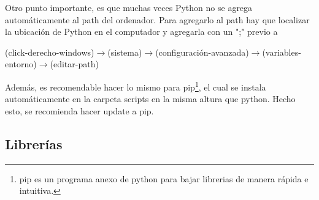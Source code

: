 \documentclass{article}
\begin{document}
Otro punto importante, es que muchas veces Python no se agrega automáticamente al path del ordenador. Para agregarlo al path hay que localizar la ubicación de Python en el computador y agregarla con un ";" previo a  
\begin{center}
(click-derecho-windows)$\rightarrow$(sistema)$\rightarrow$(configuración-avanzada)$\rightarrow$(variables-entorno)$\rightarrow$(editar-path)
\end{center}

Además, es recomendable hacer lo mismo para pip\footnote{pip es un programa anexo de python para bajar librerias de manera rápida e intuitiva.}, el cual se instala automáticamente en la carpeta scripts en la misma altura que python. Hecho esto, se recomienda hacer update a pip.

\subsection{Librerías}
\end{document}
